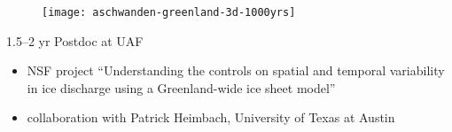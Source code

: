 \documentclass[hide notes,intlimits]{beamer}
\begin{document}
\begin{frame}[plain]
  \begin{figure}
\end{figure}
\end{frame}

\begin{frame}[plain]
  \begin{figure}
\end{figure}
\end{frame}

\begin{frame}[plain]
\begin{figure}
  \texttt{[image: aschwanden-greenland-3d-1000yrs]}
\end{figure}
\end{frame}

\begin{frame}{1.5--2 yr Postdoc at UAF}
\begin{itemize}
\item NSF project ``Understanding the controls on spatial and temporal variability in ice discharge using a Greenland-wide ice sheet model''
\item collaboration with Patrick Heimbach, University of Texas at Austin
\end{itemize}
\end{frame}
\end{document}

